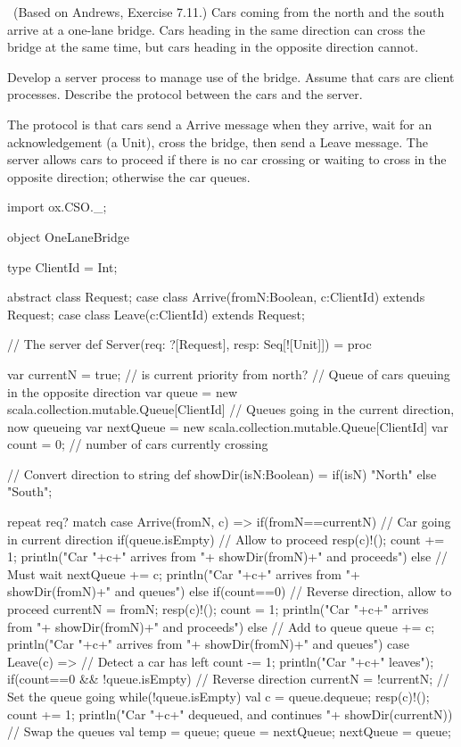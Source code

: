 \begin{question}
\Programming\ (Based on Andrews, Exercise 7.11.)
%
Cars coming from the north and the south arrive at a one-lane bridge.  Cars
heading in the same direction can cross the bridge at the same time, but cars
heading in the opposite direction cannot.

Develop a server process to manage use of the bridge.  Assume that cars are
client processes.  Describe the protocol between the cars and the server.
\end{question}


\begin{answer}
The protocol is that cars send a Arrive message when they arrive, wait for
an acknowledgement (a Unit), cross the bridge, then send a Leave message.
The server allows cars to proceed if there is no car crossing or waiting to
cross in the opposite direction; otherwise the car queues.
%
\begin{scala}
import ox.CSO._;

object OneLaneBridge{
  type ClientId = Int;
 
  abstract class Request;
  case class Arrive(fromN:Boolean, c:ClientId) extends Request;
  case class Leave(c:ClientId) extends Request;

  // The server
  def Server(req: ?[Request], resp: Seq[![Unit]]) = proc{
    var currentN = true; // is current priority from north?    
    // Queue of cars queuing in the opposite direction  
    var queue = new scala.collection.mutable.Queue[ClientId] 
    // Queues going in the current direction, now queueing
    var nextQueue = new scala.collection.mutable.Queue[ClientId] 
    var count = 0; // number of cars currently crossing

    // Convert direction to string
    def showDir(isN:Boolean) = if(isN) "North" else "South";

    repeat{
      req? match{
	case Arrive(fromN, c) => {
	  if(fromN==currentN){ // Car going in current direction
	    if(queue.isEmpty){ // Allow to proceed
	      resp(c)!(); count += 1;
	      println("Car "+c+" arrives from "+
		      showDir(fromN)+" and proceeds")
	    } else { // Must wait
	      nextQueue += c;
	      println("Car "+c+" arrives from "+
		      showDir(fromN)+" and queues")
	    }
	  }
	  else if(count==0){ 
            // Reverse direction, allow to proceed
	    currentN = fromN; resp(c)!(); count = 1;
	    println("Car "+c+" arrives from "+
		    showDir(fromN)+" and proceeds")
	  } else { // Add to queue
	    queue += c;
	    println("Car "+c+" arrives from "+
		    showDir(fromN)+" and queues")
	  }
	}
	case Leave(c) => { // Detect a car has left
	  count -= 1;
	  println("Car "+c+" leaves");
	  if(count==0 && !queue.isEmpty){ // Reverse direction
	    currentN = !currentN;
	    // Set the queue going
	    while(!queue.isEmpty){ 
	      val c = queue.dequeue; resp(c)!(); count += 1;
	      println("Car "+c+" dequeued, and continues "+
		      showDir(currentN))
	    }
	    // Swap the queues
	    val temp = queue; 
            queue = nextQueue; nextQueue = queue;
	  }
	}
      }
    }
  }

}
\end{scala}
\end{answer}
